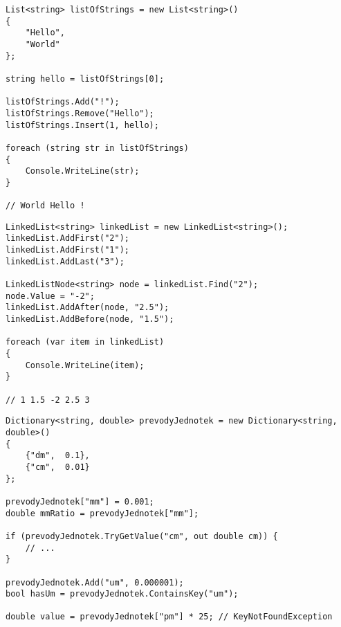 \begin{frame}[fragile]
\begin{yesblock}
\begin{lstlisting}
List<string> listOfStrings = new List<string>()
{
    "Hello",
    "World"
};

string hello = listOfStrings[0];

listOfStrings.Add("!");
listOfStrings.Remove("Hello");
listOfStrings.Insert(1, hello);

foreach (string str in listOfStrings)
{
    Console.WriteLine(str);
}

// World Hello !
\end{lstlisting}
\end{yesblock}
\end{frame}




\begin{frame}[fragile]
\begin{yesblock}
\begin{lstlisting}
LinkedList<string> linkedList = new LinkedList<string>();
linkedList.AddFirst("2");
linkedList.AddFirst("1");
linkedList.AddLast("3");

LinkedListNode<string> node = linkedList.Find("2");
node.Value = "-2";
linkedList.AddAfter(node, "2.5");
linkedList.AddBefore(node, "1.5");

foreach (var item in linkedList)
{
    Console.WriteLine(item);
}

// 1 1.5 -2 2.5 3 
\end{lstlisting}
\end{yesblock}
\end{frame}






\begin{frame}[fragile]
\begin{yesblock}
\begin{lstlisting}
Dictionary<string, double> prevodyJednotek = new Dictionary<string, double>()
{
    {"dm",  0.1},
    {"cm",  0.01}
};

prevodyJednotek["mm"] = 0.001;
double mmRatio = prevodyJednotek["mm"];

if (prevodyJednotek.TryGetValue("cm", out double cm)) {
    // ...
}

prevodyJednotek.Add("um", 0.000001);
bool hasUm = prevodyJednotek.ContainsKey("um");

double value = prevodyJednotek["pm"] * 25; // KeyNotFoundException
\end{lstlisting}
\end{yesblock}
\end{frame}



